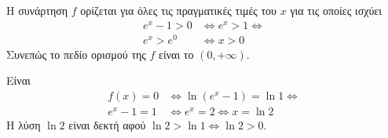 \begin{alist}
\item Η συνάρτηση $f$ ορίζεται για όλες τις πραγματικές τιμές του $x$ για τις οποίες ισχύει
\begin{align*}
e^x - 1 > 0 &\Leftrightarrow e^x > 1 \Leftrightarrow \\
e^x > e^0 &\Leftrightarrow x > 0
\end{align*}
Συνεπώς το πεδίο ορισμού της $f$ είναι το $(0, +\infty)$.
\item Είναι
\begin{align*}
f(x) = 0 &\Leftrightarrow \ln(e^x - 1) = \ln 1 \Leftrightarrow \\
e^x - 1 = 1 &\Leftrightarrow e^x = 2 \Leftrightarrow x = \ln 2
\end{align*}
Η λύση $\ln 2$ είναι δεκτή αφού $\ln 2 > \ln 1 \Leftrightarrow \ln 2 > 0$.
\end{alist}

